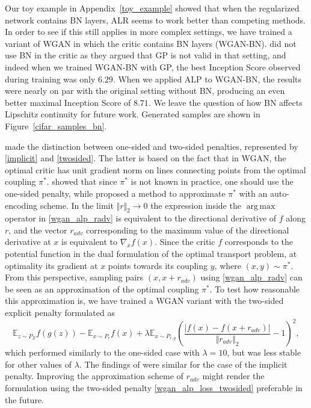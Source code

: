 \documentclass{article}
\DeclareMathOperator*{\argmax}{arg\,max}
\begin{document}
Our toy example in Appendix~\ref{toy_example} showed that when the regularized network contains BN layers, ALR seems to work better than competing methods. In order to see if this still applies in more complex settings, we have trained a variant of WGAN in which the critic contains BN layers (WGAN-BN). \citet{Gulrajanietal2017} did not use BN in the critic as they argued that GP is not valid in that setting, and indeed when we trained WGAN-BN with GP, the best Inception Score observed during training was only $6.29$. When we applied ALP to WGAN-BN, the results were nearly on par with the original setting without BN, producing an even better maximal Inception Score of $8.71$. We leave the question of how BN affects Lipschitz continuity for future work. Generated samples are shown in Figure~\ref{cifar_samples_bn}.

\citet{Gulrajanietal2017} made the distinction between one-sided and two-sided penalties, represented by \eqref{implicit} and \eqref{twosided}. The latter is based on the fact that in WGAN, the optimal critic has unit gradient norm on lines connecting points from the optimal coupling $\pi^\ast$. \citet{Petzkaetal2018} showed that since $\pi^\ast$ is not known in practice, one should use the one-sided penalty, while \citet{Gemicietal2018} proposed a method to approximate $\pi^\ast$ with an auto-encoding scheme. In the limit $\Vert r \Vert_2 \to 0$ the expression inside  the $\argmax$ operator in \eqref{wgan_alp_radv} is equivalent to the directional derivative of $f$ along $r$, and the vector $r_{adv}$ corresponding to the maximum value of the directional derivative at $x$ is equivalent to $\nabla_xf(x)$. Since the critic $f$ corresponds to the potential function in the dual formulation of the optimal transport problem, at optimality its gradient at $x$ points towards its coupling $y$, where $(x,y)\sim\pi^\ast$. From this perspective, sampling pairs $(x, x+r_{adv})$ using \eqref{wgan_alp_radv} can be seen as an approximation of the optimal coupling $\pi^\ast$. To test how reasonable this approximation is, we have trained a WGAN variant with the two-sided explicit penalty formulated as
\begin{equation} \label{wgan_alp_loss_twosided}
\mathbb{E}_{z \sim P_Z}f(g(z)) - \mathbb{E}_{x \sim P_r}f(x)
+\lambda\mathbb{E}_{x \sim P_{r,g}}\left(\frac{\lvert f(x)-f(x+r_{adv})\rvert}{\Vert r_{adv} \Vert_2}-1\right)^2,
\end{equation}
which performed similarly to the one-sided case with $\lambda=10$, but was less stable for other values of $\lambda$. The findings of \citet{Petzkaetal2018} were similar for the case of the implicit penalty. Improving the approximation scheme of $r_{adv}$ might render the formulation using the two-sided penalty \eqref{wgan_alp_loss_twosided} preferable in the future.
\end{document}
